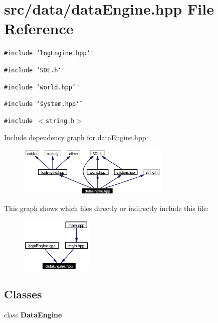 \section{src/data/data\-Engine.hpp File Reference}
\label{dataEngine_8hpp}
{\tt \#include \char`\"{}log\-Engine.hpp\char`\"{}}\par
{\tt \#include \char`\"{}SDL.h\char`\"{}}\par
{\tt \#include \char`\"{}world.hpp\char`\"{}}\par
{\tt \#include \char`\"{}system.hpp\char`\"{}}\par
{\tt \#include $<$string.h$>$}\par


Include dependency graph for data\-Engine.hpp:\begin{figure}[H]
\begin{center}
\leavevmode
\includegraphics[width=205pt]{dataEngine_8hpp__incl}
\end{center}
\end{figure}


This graph shows which files directly or indirectly include this file:\begin{figure}[H]
\begin{center}
\leavevmode
\includegraphics[width=97pt]{dataEngine_8hpp__dep__incl}
\end{center}
\end{figure}
\subsection*{Classes}
\begin{CompactItemize}
\item 
class {\bf Data\-Engine}
\end{CompactItemize}
